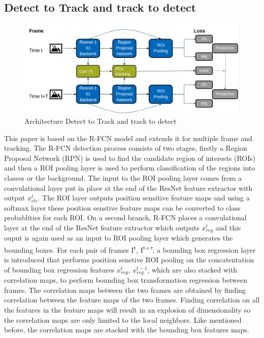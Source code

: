 \documentclass[conference]{IEEEtran}
\begin{document}
\subsection{Detect to Track and track to detect}
\begin{figure}[h]
\includegraphics[width=\columnwidth]{D&T-architecture}
\caption{Architecture Detect to Track and track to detect}
\end{figure}
This paper is based on the R-FCN\cite{b19} model and extends it for multiple frame and tracking. \newline
The R-FCN\cite{b19} detection process consists of two stages, firstly a Region Proposal Network (RPN) is used to find the candidate region of interests (ROIs) and then a ROI pooling layer is used to perform classification of the regions into classes or the background. The input to the ROI pooling layer comes from a convulational layer put in place at the end of the ResNet feature extractor with output $x^t_{cls}$. The ROI layer outputs position sensitive feature maps and using a softmax layer these position senstive feature maps can be converted to class probablities for each ROI. On a second branch, R-FCN places a convulational layer at the end of the ResNet feature extractor which outputs $x^t_{reg}$ and this ouput is again used as an input to ROI pooling layer which generates the bounding boxes. \newline
For each pair of frames I\textsuperscript{t}, I\textsuperscript{t+$\tau$}, a bounding box regression layer is introduced that performs position senstive ROI pooling on the concatentation of bounding box regression features $x^t_{reg}$, $x^{t-1}_{reg}$, which are also stacked with correlation maps, to perform bounding box transformation regression between frames. The correlation maps between the two frames are obtained by finding correlation between the feature maps of the two frames. Finding correlation on all the features in the feature maps will result in an explosion of dimensionality so the correlation maps are only limited to the local neighbors. Like mentioned before, the correlation maps are stacked with the bounding box features maps. \newline
\end{document}
